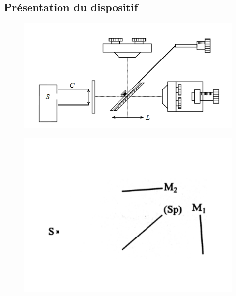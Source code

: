 \documentclass[10pt]{beamer}
\begin{document}
\subsection{Présentation du dispositif}
\begin{frame}{\insertsubsection}
    \begin{figure}
        \centering
        \includegraphics[width=1\textwidth]{Michelson.png}
    \end{figure}
\end{frame}
\begin{frame}{\insertsubsection}
    \begin{figure}
        \centering
        \includegraphics[width=1\textwidth]{M1.png}
    \end{figure}
\end{frame}
\end{document}

